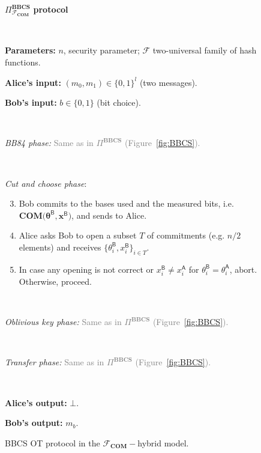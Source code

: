 \begin{figure}[h!]
\centering
\begin{tcolorbox}
                        
    \centerline{$\Pi^{\textbf{BBCS}}_{\mathcal{F}_{\textbf{COM}}}$ \textbf{protocol}}
            
    \
    
    \textbf{Parameters:} $n$, security parameter; $\mathcal{F}$ two-universal family of hash functions.
    
    \textbf{Alice's input:} $(m_0, m_1)\in\{0,1\}^l$ (two messages). 
    
    \textbf{Bob's input:} $b\in\{0,1\}$ (bit choice).
    
    \
    
    \textit{BB84 phase:} \textcolor{gray}{Same as in $\Pi^{\textbf{BBCS}}$ (Figure~\ref{fig:BBCS}).}
    
    
    \
    
    \textit{Cut and choose phase}:
    \begin{enumerate}
    \setcounter{enumi}{2}
        \item Bob commits to the bases used and the measured bits, i.e. $\textbf{COM}\big(\bm{\theta}^\mathsf{B}, \bm{x}^\mathsf{B}\big)$, and sends to Alice. %
        \item Alice asks Bob to open a subset $T$ of commitments (e.g. $n/2$ elements) and receives $\{\theta_i^\mathsf{B}, x_i^\mathsf{B}\}_{i\in T}$.%
        \item In case any opening is not correct or $x_i^\mathsf{B} \neq x_i^\mathsf{A}$ for $\theta_i^\mathsf{B} = \theta_i^\mathsf{A}$, abort. Otherwise, proceed. 
    \end{enumerate}
    
    \
    
    \textit{Oblivious key phase:} \textcolor{gray}{Same as in $\Pi^{\textbf{BBCS}}$ (Figure~\ref{fig:BBCS}).}
     
    \
     
    \textit{Transfer phase:} \textcolor{gray}{Same as in $\Pi^{\textbf{BBCS}}$ (Figure~\ref{fig:BBCS}).}
    
    \
    
\textbf{Alice's output:} $\bot$.

\textbf{Bob's output:} $m_b$.
    
\end{tcolorbox} 
    \caption{BBCS OT protocol in the $\mathcal{F}_{\textbf{COM}}-$hybrid model.}
    \label{fig:BBCS_COM}
\end{figure}

